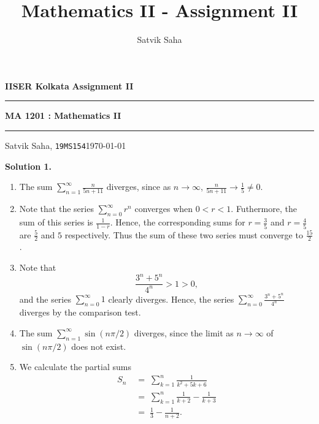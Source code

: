 \documentclass[10pt]{article}
\title{Mathematics II - Assignment II}
\author{Satvik Saha}
\date{}
\begin{document}
        \par\textbf{IISER Kolkata} \hfill \textbf{Assignment II}
        \vspace{3pt}
        \hrule
        \vspace{3pt}
        \begin{center}
                \LARGE{\textbf{MA 1201 : Mathematics II}}
        \end{center}
        \vspace{3pt}
        \hrule
        \vspace{3pt}
        Satvik Saha, \texttt{19MS154}\hfill\today
        \vspace{20pt}

        \textbf{Solution 1.}
        \begin{enumerate}
                \item   The sum \(
                        \sum_{n = 1}^\infty \frac{n}{5n + 11}
                        \) diverges, since as $n \to \infty$, $\frac{n}{5n + 11} \to \frac{1}{5} \neq 0$.
                \item   Note that the series $\sum_{n = 0}^\infty r^n$ converges when $0 < r < 1$.
                        Futhermore, the sum of this series is $\frac{1}{1 - r}$. Hence, the corresponding sums
                        for $r = \frac{3}{5}$ and $r = \frac{4}{5}$ are $\frac{5}{2}$ and $5$ respectively.
                        Thus the sum of these two series must converge to $\frac{15}{2}$.
                \item   Note that
                        \[
                        \frac{3^n + 5^n}{4^n} > 1 > 0,
                        \]
                        and the series $\sum_{n = 0}^\infty 1$ clearly diverges. Hence, the series $\sum_{n = 0}^\infty \frac{3^n + 5^n}{4^n}$
                        diverges by the comparison test.
                \item The sum $\sum_{n = 1}^\infty \sin(n\pi/2)$ diverges, since the limit as $n \to \infty$ of $\sin(n\pi/2)$ does not exist.
                \item We calculate the partial sums
                        \begin{align*}
                                S_n \;&=\; \sum_{k = 1}^n \frac{1}{k^2 + 5k + 6} \\
                                        \;&=\; \sum_{k = 1}^n \frac{1}{k + 2} - \frac{1}{k + 3} \\
                                        \;&=\; \frac{1}{3} - \frac{1}{n + 2}.
                        \end{align*}

\end{enumerate}
\end{document}
